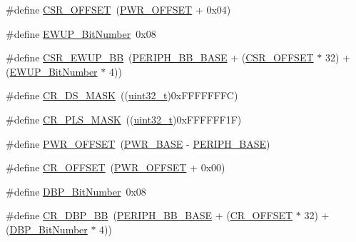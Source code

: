 \begin{DoxyCompactItemize}
\item 
\#define \hyperlink{group___p_w_r___private___defines_ga984cbe73312b6d3d355c5053763d499a}{C\+S\+R\+\_\+\+O\+F\+F\+S\+ET}~(\hyperlink{openmotestm_2library_2src_2stm32f10x__pwr_8c_a7f88bce73931300319824f22578f90de}{P\+W\+R\+\_\+\+O\+F\+F\+S\+ET} + 0x04)
\item 
\#define \hyperlink{group___p_w_r___private___defines_ga94fe0520e8f9b71fa2b99c0565ec70ea}{E\+W\+U\+P\+\_\+\+Bit\+Number}~0x08
\item 
\#define \hyperlink{group___p_w_r___private___defines_gaaff864595f697850b19173b0bca991b0}{C\+S\+R\+\_\+\+E\+W\+U\+P\+\_\+\+BB}~(\hyperlink{openmotestm_2library_2inc_2stm32f10x__map_8h_aed7efc100877000845c236ccdc9e144a}{P\+E\+R\+I\+P\+H\+\_\+\+B\+B\+\_\+\+B\+A\+SE} + (\hyperlink{openmotestm_2library_2src_2stm32f10x__rcc_8c_a984cbe73312b6d3d355c5053763d499a}{C\+S\+R\+\_\+\+O\+F\+F\+S\+ET} $\ast$ 32) + (\hyperlink{openmotestm_2library_2src_2stm32f10x__pwr_8c_a94fe0520e8f9b71fa2b99c0565ec70ea}{E\+W\+U\+P\+\_\+\+Bit\+Number} $\ast$ 4))
\item 
\#define \hyperlink{group___p_w_r___private___defines_ga8ee6bf9218f3c476629dd9ee70deef21}{C\+R\+\_\+\+D\+S\+\_\+\+M\+A\+SK}~((\hyperlink{_p_e___types_8h_a33594304e786b158f3fb30289278f5af}{uint32\+\_\+t})0x\+F\+F\+F\+F\+F\+F\+F\+C)
\item 
\#define \hyperlink{group___p_w_r___private___defines_gac4a30eebdd1d292331a578b189962e77}{C\+R\+\_\+\+P\+L\+S\+\_\+\+M\+A\+SK}~((\hyperlink{_p_e___types_8h_a33594304e786b158f3fb30289278f5af}{uint32\+\_\+t})0x\+F\+F\+F\+F\+F\+F1\+F)
\item 
\#define \hyperlink{group___p_w_r___private___defines_ga7f88bce73931300319824f22578f90de}{P\+W\+R\+\_\+\+O\+F\+F\+S\+ET}~(\hyperlink{openmotestm_2library_2inc_2stm32f10x__map_8h_ac691ec23dace8b7a649a25acb110217a}{P\+W\+R\+\_\+\+B\+A\+SE} -\/ \hyperlink{openmotestm_2library_2inc_2stm32f10x__map_8h_a9171f49478fa86d932f89e78e73b88b0}{P\+E\+R\+I\+P\+H\+\_\+\+B\+A\+SE})
\item 
\#define \hyperlink{group___p_w_r___private___defines_gafa1d3d0ea72132df651c76fc1bdffffc}{C\+R\+\_\+\+O\+F\+F\+S\+ET}~(\hyperlink{openmotestm_2library_2src_2stm32f10x__pwr_8c_a7f88bce73931300319824f22578f90de}{P\+W\+R\+\_\+\+O\+F\+F\+S\+ET} + 0x00)
\item 
\#define \hyperlink{group___p_w_r___private___defines_ga36ff45d972bf94f31f172fd53cf44d23}{D\+B\+P\+\_\+\+Bit\+Number}~0x08
\item 
\#define \hyperlink{group___p_w_r___private___defines_ga799ab60bdbcfc1076cf2d7f206d09b0c}{C\+R\+\_\+\+D\+B\+P\+\_\+\+BB}~(\hyperlink{openmotestm_2library_2inc_2stm32f10x__map_8h_aed7efc100877000845c236ccdc9e144a}{P\+E\+R\+I\+P\+H\+\_\+\+B\+B\+\_\+\+B\+A\+SE} + (\hyperlink{openmotestm_2library_2src_2stm32f10x__rcc_8c_afa1d3d0ea72132df651c76fc1bdffffc}{C\+R\+\_\+\+O\+F\+F\+S\+ET} $\ast$ 32) + (\hyperlink{openmotestm_2library_2src_2stm32f10x__pwr_8c_a36ff45d972bf94f31f172fd53cf44d23}{D\+B\+P\+\_\+\+Bit\+Number} $\ast$ 4))

\end{DoxyCompactItemize}
